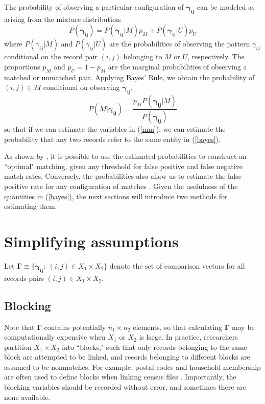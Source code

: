 \documentclass[11pt,reqno]{amsart}
\newcommand\gamij{\mathbf{\gamma_{ij}}}
\begin{document}
The probability of observing a particular configuration of $\gamij$ can be modeled as arising from the mixture distribution:
\begin{equation}
P(\gamij) = P(\gamij | M) p_M + P(\gamij | U) p_U 
\label{mm}
\end{equation}
where $P(\gamma_{ij} | M)$ and $P(\gamma_{ij} | U)$ are the probabilities of observing the pattern $\gamma_{ij}$ conditional on the record pair $(i,j)$ belonging to $M$ or $U$, respectively.  The proportions $p_M$ and $p_U = 1-p_M$ are the marginal probabilities of observing a matched or unmatched pair.  Applying Bayes' Rule, we obtain the probability of $(i,j) \in M$ conditional on observing $\gamij$,
\begin{equation} P(M | \gamij) = \frac{p_M P(\gamij | M)}{P(\gamij)} \label{bayes} \end{equation}
so that if we can estimate the variables in (\ref{mm}), we can estimate the probability that any two records refer to the same entity in (\ref{bayes}).  

As shown by \cite{fs1969}, it is possible to use the estimated probabilities to construct an ``optimal" matching, given any threshold for false positive and false negative match rates.  Conversely, the probabilities also allow us to estimate the false positive rate for any configuration of matches \citep{bda3}.  Given the usefulness of the quantities in (\ref{bayes}), the next sections will introduce two methods for estimating them.

\section{Simplifying assumptions}

Let $\mathbf{\Gamma} \equiv \{\mathbf{\gamma_{ij}}: \  (i,j) \in X_1\times X_2\}$ denote the set of comparison vectors for all records pairs $(i,j) \in X_1\times X_2$.  

\subsection{Blocking} 

Note that $\mathbf{\Gamma}$ contains potentially $n_1 \times n_2$ elements, so that calculating $\mathbf{\Gamma}$ may be computationally expensive when $X_1$ or $X_2$ is large.  In practice, researchers partition $X_1\times X_2$ into ``blocks," such that only records belonging to the same block are attempted to be linked, and records belonging to different blocks are assumed to be nonmatches.  For example, postal codes and household membership are often used to define blocks when linking census files \citep{herzog2007}.  Importantly, the blocking variables should be recorded without error, and sometimes there are none available. 
\end{document}
